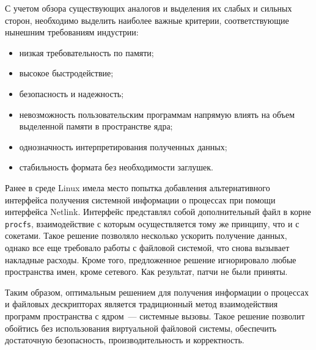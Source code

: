 С учетом обзора существующих аналогов и выделения их слабых и сильных сторон,
необходимо выделить наиболее важные критерии, соответствующие нынешним
требованиям индустрии:

\begin{itemize}
\item низкая требовательность по памяти;
\item высокое быстродействие;
\item безопасность и надежность;
\item невозможность пользовательским программам напрямую влиять на объем
  выделенной памяти в пространстве ядра;
\item однозначность интерпретирования полученных данных;
\item стабильность формата без необходимости заглушек.
\end{itemize}

Ранее в среде Linux имела место попытка добавления альтернативного интерфейса
получения системной информации о процессах при помощи интерфейса
Netlink\cite{vagin}. Интерфейс представлял собой дополнительный файл в корне
\texttt{procfs}, взаимодействие с которым осуществляется тому же принципу, что и
с сокетами. Такое решение позволяло несколько ускорить получение данных, однако
все еще требовало работы с файловой системой, что снова вызывает накладные
расходы. Кроме того, предложенное решение игнорировало любые пространства имен,
кроме сетевого. Как результат, патчи не были приняты.

Таким образом, оптимальным решением для получения информации о процессах и
файловых дескрипторах является традиционный метод взаимодействия программ
пространства с ядром~--- системные вызовы\cite{kernel_docs}. Такое решение
позволит обойтись без использования виртуальной файловой системы, обеспечить
достаточную безопасность, производительность и корректность.
